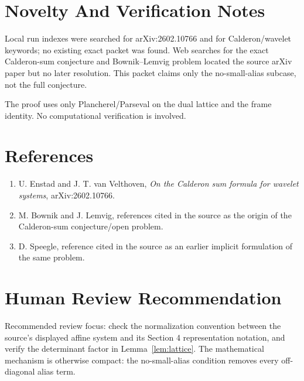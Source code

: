 \documentclass[11pt]{article}
\begin{document}
\section*{Novelty And Verification Notes}

Local run indexes were searched for arXiv:2602.10766 and for Calderon/wavelet
keywords; no existing exact packet was found.  Web searches for the exact
Calderon-sum conjecture and Bownik--Lemvig problem located the source arXiv
paper but no later resolution.  This packet claims only the no-small-alias
subcase, not the full conjecture.

The proof uses only Plancherel/Parseval on the dual lattice and the frame
identity.  No computational verification is involved.

\section*{References}

\begin{enumerate}
\item U. Enstad and J. T. van Velthoven,
\emph{On the Calderon sum formula for wavelet systems}, arXiv:2602.10766.
\item M. Bownik and J. Lemvig, references cited in the source as the origin of
the Calderon-sum conjecture/open problem.
\item D. Speegle, reference cited in the source as an earlier implicit
formulation of the same problem.
\end{enumerate}

\section*{Human Review Recommendation}

Recommended review focus: check the normalization convention between the
source's displayed affine system and its Section 4 representation notation,
and verify the determinant factor in Lemma~\ref{lem:lattice}.  The mathematical
mechanism is otherwise compact: the no-small-alias condition removes every
off-diagonal alias term.
\end{document}
